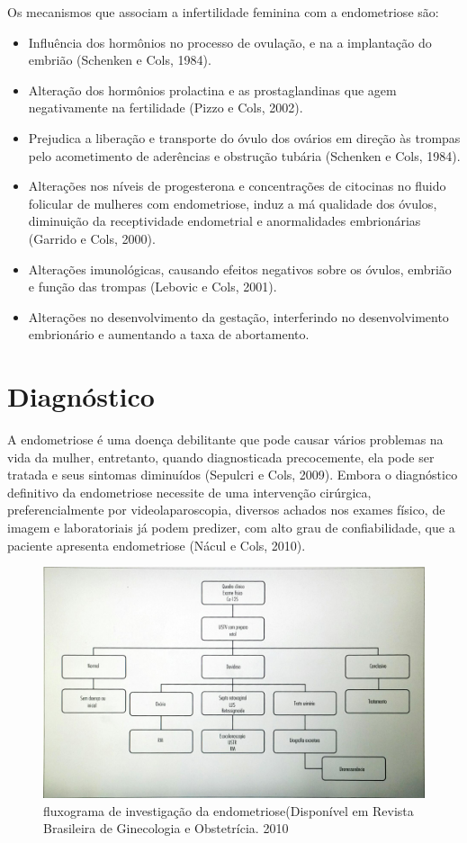 \documentclass[12pt]{article} %
\begin{document}
Os mecanismos que associam a infertilidade feminina com a endometriose são:

\begin{itemize}
\item Influência dos hormônios no processo de ovulação, e na a implantação do embrião (Schenken e Cols, 1984).
\item Alteração dos hormônios prolactina e as prostaglandinas que agem negativamente na fertilidade (Pizzo e Cols, 2002).
\item Prejudica a liberação e transporte do óvulo dos ovários em direção às trompas pelo acometimento de aderências e obstrução tubária (Schenken e Cols, 1984).
\item Alterações nos níveis de progesterona e concentrações de citocinas no fluido folicular de mulheres com endometriose, induz a má qualidade dos óvulos, diminuição da receptividade endometrial e anormalidades embrionárias (Garrido e Cols, 2000).
\item Alterações imunológicas, causando efeitos negativos sobre os óvulos, embrião e função das trompas (Lebovic e Cols, 2001).
\item Alterações no desenvolvimento da gestação, interferindo no desenvolvimento embrionário e aumentando a taxa de abortamento.
\end{itemize}


\section{Diagnóstico}


A endometriose é uma doença debilitante que pode causar vários
problemas na vida da mulher, entretanto, quando diagnosticada
precocemente, ela pode ser tratada e seus sintomas diminuídos (Sepulcri e Cols, 2009).  Embora
o diagnóstico definitivo da endometriose necessite de uma intervenção
cirúrgica, preferencialmente por videolaparoscopia, diversos achados
nos exames físico, de imagem e laboratoriais já podem predizer, com
alto grau de confiabilidade, que a paciente apresenta endometriose (Nácul e Cols, 2010).

\begin{figure}[h!]
\centering
\includegraphics[width=14cm]{tabela.png}
\caption[fluxograma de investigação da endometriose]{fluxograma de investigação da endometriose(Disponível em Revista Brasileira de Ginecologia e Obstetrícia. 2010}
\end{figure}
\end{document}

